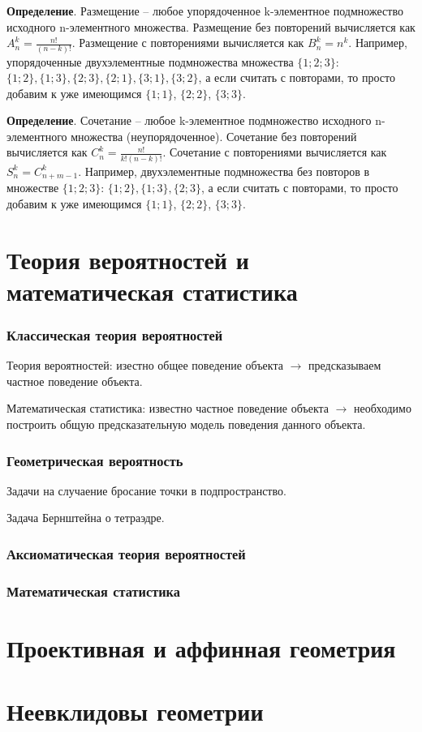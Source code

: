\documentclass[a4paper]{book}
\begin{document}
\textbf{Определение}. Размещение -- любое упорядоченное k-элементное подмножество исходного n-элементного множества. Размещение без повторений вычисляется как $A^k_n = \frac{n!}{(n-k)!}$. Размещение с повторениями вычисляется как $B^k_n = n^k$. Например, упорядоченные двухэлементные подмножества множества $\{1;2;3\}$: $\{1;2\}, \{1;3\}, \{2;3\}, \{2;1\}, \{3;1\}, \{3;2\}$, а если считать с повторами, то просто добавим к уже имеющимся $\{1;1\}$, $\{2;2\}$, $\{3;3\}$. 

\textbf{Определение}. Сочетание -- любое k-элементное подмножество исходного n-элементного множества (неупорядоченное). Сочетание без повторений вычисляется как $C^k_n = \frac{n!}{k!(n-k)!}$. Сочетание с повторениями вычисляется как $S_n^k = C_{n+m-1}^k$. Например, двухэлементные подмножества без повторов в множестве $\{1;2;3\}$: $\{1;2\}, \{1;3\}, \{2;3\}$, а если считать с повторами, то просто добавим к уже имеющимся $\{1;1\}$, $\{2;2\}$, $\{3;3\}$. 

\chapter{Теория вероятностей и математическая статистика}
\subsection{Классическая теория вероятностей}

Теория вероятностей: изестно общее поведение объекта $\longrightarrow$ предсказываем частное поведение объекта.
 
Математическая статистика: известно частное поведение объекта $\longrightarrow$ необходимо построить общую предсказательную модель поведения данного объекта. 

\subsection{Геометрическая вероятность}
Задачи на случаение бросание точки в подпространство. 

Задача Бернштейна о тетраэдре. 

\subsection{Аксиоматическая теория вероятностей}

\subsection{Математическая статистика}


\chapter{Проективная и аффинная геометрия}
\chapter{Неевклидовы геометрии}
\end{document}
